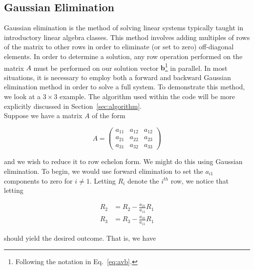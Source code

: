 \documentclass[12pt]{article}
\numberwithin{equation}{section}
\begin{document}
\subsection{Gaussian Elimination}
\label{subsec:gausselim}

Gaussian elimination is the method of solving linear systems typically taught in introductory linear algebra classes. This method involves adding multiples of rows of the matrix to other rows in order to eliminate (or set to zero) off-diagonal elements.  In order to determine a solution, any row operation performed on the matrix $A$ must be performed on our solution vector $\textbf{b}$\footnote{Following the notation in Eq.~\ref{eq:avb}.} in parallel.  In most situations, it is necessary to employ both a forward and backward Gaussian elimination method in order to solve a full system.  To demonstrate this method, we look at a $3\times 3$ example.  The algorithm used within the code will be more explicitly discussed in Section~\ref{sec:algorithm}.
\\\indent Suppose we have a matrix $A$ of the form

\begin{equation}
\label{eq:ainit}
A = \left(
\begin{array}{ccc}
a_{11} & a_{12} & a_{12} \\
a_{21} & a_{22} & a_{23} \\
a_{31} & a_{32} & a_{33}
\end{array}
\right)
\end{equation}
\vspace{.2cm}

\noindent and we wish to reduce it to row echelon form.  We might do this using Gaussian elimination.  To begin, we would use forward elimination to set the $a_{i1}$ components to zero for $i\neq1$.  Letting $R_{i}$ denote the $i^{th}$ row, we notice that letting 

\begin{equation}
\label{eq:rowops1}
\begin{align}
R_{2} & = R_{2} - \frac{a_{21}}{a_{11}}R_{1} \\
R_{3} & = R_{3} - \frac{a_{31}}{a_{11}}R_{1}
\end{align}
\end{equation}

\noindent should yield the desired outcome.  That is, we have 
\end{document}
